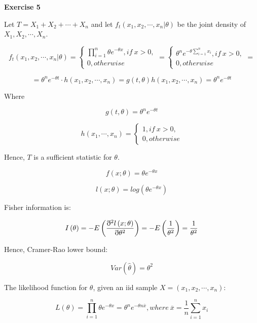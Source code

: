 \documentclass[12pt]{article}
\begin{document}
\textbf{Exercise 5}

\begin{list}{()~}{}
\item Let $T = X_1 + X_2 + \cdots + X_n$ and let $f_t\left(x_1, x_2, \cdots, x_n | \theta\right)$ be the joint density of $X_1, X_2, \cdots, X_n$.


\[f_t\left(x_1, x_2, \cdots, x_n | \theta\right) =\left\{
\begin{array}{l}
{\displaystyle \prod_{i=1}^{n}} \theta e^{-\theta x}, if\ x > 0,\\
0, otherwise
\end{array} \right. = \left\{
\begin{array}{l}
\theta^n e^{-\theta \sum_{i=1}^n x_i}, if\ x > 0,\\
0, otherwise
\end{array} \right. = \] 

\[= \theta^n e^{-\theta t}\cdot h\left(x_1, x_2, \cdots, x_n\right)=g\left(t, \theta\right)h\left(x_1, x_2, \cdots, x_n\right) = \theta^n e^{-\theta t}\]

Where 

\[g\left(t, \theta\right) = \theta^{n}e^{-\theta t}\]

\[h\left(x_1, \cdots, x_n\right) = \left\{
\begin{array}{l}
1, if\ x > 0,\\
0, otherwise
\end{array} \right.\]

Hence, $T$ is a sufficient statistic for $\theta$.
\item
\[f\left(x; \theta\right)=\theta e^{-\theta x}\]

\[l\left(x; \theta\right)=log\left(\theta e^{-\theta x}\right)\]

Fisher information is:

\[I\left(\theta\right)=-E\left(\dfrac{\eth^2 l\left(x; \theta\right)}{\eth \theta^2}\right) = -E\left(\-\dfrac{1}{\theta^2}\right)=\dfrac{1}{\theta^2}\]

Hence, Cramer-Rao lower bound:

\[Var\left(\hat{\theta}\right)=\theta^2\]
\item The likelihood function for $\theta$, given an iid sample $X=\left(x_1, x_2, \cdots, x_n\right)$:

\[L\left(\theta\right) = {\displaystyle \prod_{i=1}^{n}} \theta e^{-\theta x} = \theta^n e^{-\theta n \overline{x}}, where\ \overline{x} = \dfrac{1}{n}\sum_{i=1}^n x_i\]


\end{list}
\end{document}
